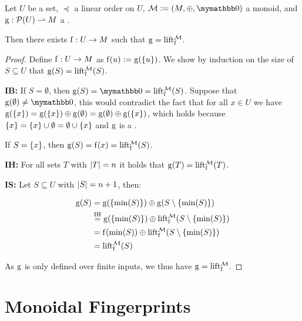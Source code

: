\begin{proposition}
Let $U$ be a set, $\preceq$ a linear order on $U$, $\mathcal{M} \defeq (M, \groupaddsym, \neutraladd)$ a monoid, and ${\operatorname{g}}: {\mathcal{P}({U})} \rightharpoonup{M}$ a \somewhatmorphism.

Then there exists ${\operatorname{f}}: {U} \rightarrow {M}$ such that $\operatorname{g} = \operatorname{lift_{\operatorname{f}}^{\mathcal{M}}}$.

\begin{proof}
Define ${\operatorname{f}}: {U} \rightarrow {M}$ as $\operatorname{f}(u) \vcentcolon= \operatorname{g}(\{u\})$. We show by induction on the size of $S \subseteq U$ that $\operatorname{g}(S) = \operatorname{lift_{f}^{\mathcal{M}}}(S)$.

\vspace{10pt}

\textbf{IB:} If $S = \emptyset$, then $\g(S) = \neutraladd = \lift{\f}{\mathcal{M}}(S)$. Suppose that $\g(\emptyset) \neq \neutraladd$, this would contradict the fact that for all $x \in U$ we have $\operatorname{g}(\{x\}) = \operatorname{g}(\{x\}) \oplus \operatorname{g}(\emptyset) = \operatorname{g}(\emptyset) \oplus \operatorname{g}(\{x\})$, which holds because $\{x\} = \{x\} \cup \emptyset = \emptyset \cup \{x\}$ and $\operatorname{g}$ is a \somewhatmorphism.

If $S = \{x\}$, then $\operatorname{g}(S) = \operatorname{f}(x) = \operatorname{lift_{\operatorname{f}}^{\mathcal{M}}}(S)$.

\textbf{IH:} For all sets $T$ with $|{T}| = n$ it holds that $\operatorname{g}(T) = \operatorname{lift_{\operatorname{f}}^{\mathcal{M}}}(T)$.

\textbf{IS:} Let $S \subseteq U$ with $|{S}| = n + 1$, then:

\begin{align*}
\operatorname{g}(S) &= \operatorname{g}(\{\min(S)\}) \oplus \operatorname{g}(S \setminus \{\min(S)\})\\
&\overset{\text{IH}}= \operatorname{g}(\{\min(S)\}) \oplus \operatorname{lift_{\operatorname{f}}^{\mathcal{M}}}(S \setminus \{\min(S)\})\\
&= \operatorname{f}(\min(S)) \oplus \operatorname{lift_{\operatorname{f}}^{\mathcal{M}}}(S \setminus \{\min(S)\})\\
&= \operatorname{lift_{\operatorname{f}}^{\mathcal{M}}}(S)\\
\end{align*}

\vspace{10pt}
As $\operatorname{g}$ is only defined over finite inputs, we thus have $\operatorname{g} = \operatorname{lift_{\operatorname{f}}^{\mathcal{M}}}$.
\end{proof}
\end{proposition}

\section{Monoidal Fingerprints}
\label{collisions}

